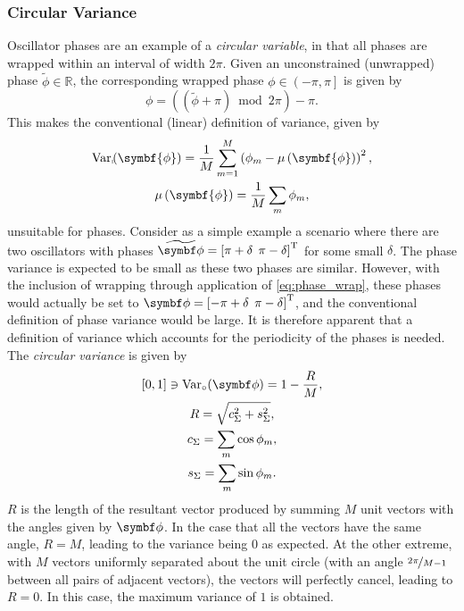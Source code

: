 \subsubsection{Circular Variance}
Oscillator phases are an example of a \emph{circular variable}, in that all
phases are wrapped within an interval of width $2 \pi$. Given an unconstrained
(unwrapped) phase $\widetilde{\phi} \in \mathbb{R}$, the corresponding wrapped
phase $\phi \in \left( -\pi, \pi \right]$ is given by
\begin{equation}
    \phi = \left(\left(\widetilde{\phi} + \pi\right) \bmod 2 \pi\right) - \pi.
    \label{eq:phase_wrap}
\end{equation}
This makes the conventional (linear)
definition of variance, given by
\begin{subequations}
    \begin{gather}
        \Var_{\shortmid}\hspace*{-3pt}\left(\symbf{\phi}\right) =
            \frac{1}{M} \sum_{m=1}^{M} \left(\phi_m - \mu\left(\symbf{\phi}\right)\right)^2, \\
        \mu\left(\symbf{\phi}\right) = \frac{1}{M} \sum_{m} \phi_m,
    \end{gather}
\end{subequations}
unsuitable for phases. Consider as a simple example a scenario
where there are two oscillators with phases $\widetilde{\bdphi} = \left[ \pi +
\delta\:\:\pi - \delta \right]\T$ for some small $\delta$.
The phase variance is expected to be small as these two phases are similar.
However, with the inclusion of wrapping through application of
\eqref{eq:phase_wrap}, these phases would actually be set to $\bdphi = \left[
    -\pi
+ \delta\:\:\pi - \delta \right]\T$, and the conventional definition of phase
variance would be large. It is therefore apparent that a definition of variance
which accounts for the periodicity of the phases is needed. The \emph{circular
variance} is given by\cite[Chapter 3]{Fisher1993}
\begin{subequations}
    \begin{gather}
        [0, 1] \ni \circvar = 1 - \frac{R}{M},\\
        R = \sqrt{c_{\Sigma}^2 + s_{\Sigma}^2}, \\
        c_{\Sigma} = \sum_{m} \cos \phi_m, \\
        s_{\Sigma} = \sum_{m} \sin \phi_m.
    \end{gather}
\end{subequations}
$R$ is the length of the resultant vector produced by summing $M$ unit vectors
with the angles given by $\bdphi$. In the case that all the vectors have the
same angle, $R=M$, leading to the variance being $0$ as expected. At the other
extreme, with $M$ vectors uniformly separated about the unit circle (with an
angle $\nicefrac{2 \pi}{M - 1}$ between all pairs of adjacent vectors), the
vectors will perfectly cancel, leading to $R=0$. In this case, the maximum
variance of $1$ is obtained.

